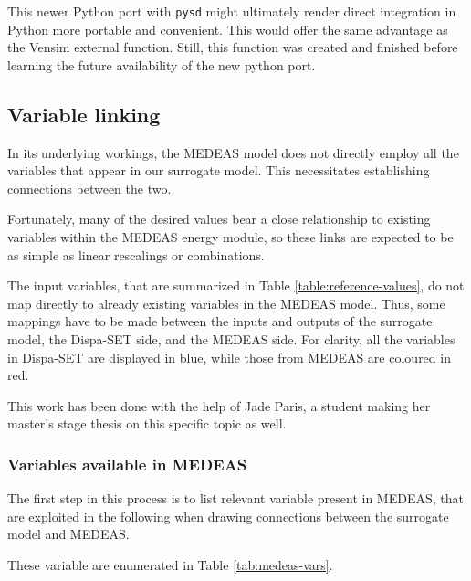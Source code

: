 This newer Python port with \texttt{pysd} might ultimately render direct integration in Python more portable and convenient. This would offer the same advantage as the Vensim external function. Still, this function was created and finished before learning the future availability of the new python port.

\subsection{Variable linking}

In its underlying workings, the MEDEAS model does not directly employ all the variables that appear in our surrogate model. This necessitates establishing connections between the two.

Fortunately, many of the desired values bear a close relationship to existing variables within the MEDEAS energy module, so these links are expected to be as simple as linear rescalings or combinations.

The input variables, that are summarized in Table \ref{table:reference-values}, do not map directly to already existing variables in the MEDEAS model. Thus, some mappings have to be made between the inputs and outputs of the surrogate model, the Dispa-SET side, and the MEDEAS side. For clarity, all the variables in Dispa-SET are displayed in blue, while those from MEDEAS are coloured in red.

This work has been done with the help of Jade Paris, a student making her master's stage thesis on this specific topic as well.

\subsubsection{Variables available in MEDEAS}

The first step in this process is to list relevant variable present in MEDEAS, that are exploited in the following when drawing connections between the surrogate model and MEDEAS.

These variable are enumerated in Table \ref{tab:medeas-vars}.

